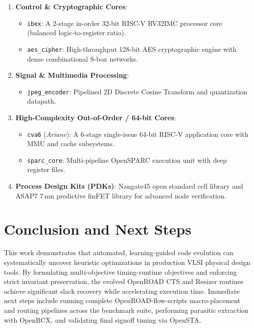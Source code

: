 \documentclass[10pt,twocolumn]{article}
\begin{document}
\begin{enumerate}
    \item \textbf{Control \& Cryptographic Cores}:
    \begin{itemize}
        \item \texttt{ibex}: A 2-stage in-order 32-bit RISC-V RV32IMC processor core (balanced logic-to-register ratio).
        \item \texttt{aes\_cipher}: High-throughput 128-bit AES cryptographic engine with dense combinational S-box networks.
    \end{itemize}
    \item \textbf{Signal \& Multimedia Processing}:
    \begin{itemize}
        \item \texttt{jpeg\_encoder}: Pipelined 2D Discrete Cosine Transform and quantization datapath.
    \end{itemize}
    \item \textbf{High-Complexity Out-of-Order / 64-bit Cores}:
    \begin{itemize}
        \item \texttt{cva6} (\textit{Ariane}): A 6-stage single-issue 64-bit RISC-V application core with MMU and cache subsystems.
        \item \texttt{sparc\_core}: Multi-pipeline OpenSPARC execution unit with deep register files.
    \end{itemize}
    \item \textbf{Process Design Kits (PDKs)}: Nangate45 open standard cell library and ASAP7 $7\,\text{nm}$ predictive finFET library for advanced node verification.
\end{enumerate}

\section{Conclusion and Next Steps}
This work demonstrates that automated, learning-guided code evolution can systematically uncover heuristic optimizations in production VLSI physical design tools. By formulating multi-objective timing-runtime objectives and enforcing strict invariant preservation, the evolved OpenROAD CTS and Resizer routines achieve significant slack recovery while accelerating execution time. Immediate next steps include running complete OpenROAD-flow-scripts macro-placement and routing pipelines across the benchmark suite, performing parasitic extraction with OpenRCX, and validating final signoff timing via OpenSTA.
\end{document}
